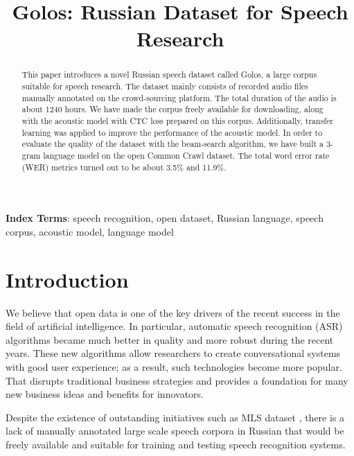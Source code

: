 \documentclass[a4paper]{article}
\title{Golos: Russian Dataset for Speech Research}
\begin{document}
\maketitle
% 
\begin{abstract}
 
This paper introduces a novel Russian speech dataset called Golos, a large corpus suitable for speech research. The dataset mainly consists of recorded audio files manually annotated on the crowd-sourcing platform. The total duration of the audio is about 1240 hours. We have made the corpus freely available for downloading, along with the acoustic model with CTC loss prepared on this corpus. Additionally, transfer learning was applied to improve the performance of the acoustic model. In order to evaluate the quality of the dataset with the beam-search algorithm, we have built a 3-gram language model on the open Common Crawl dataset. The total word error rate (WER) metrics turned out to be about 3.5\% and 11.9\%.

\end{abstract}
\noindent\textbf{Index Terms}: speech recognition, open dataset, Russian language, speech corpus, acoustic model, language model

\section{Introduction}
We believe that open data is one of the key drivers of the recent success in the field of artificial intelligence. In particular, automatic speech recognition (ASR) algorithms became much better in quality and more robust during the recent years. These new algorithms allow researchers to create conversational systems with good user experience; as a result, such technologies become more popular. That disrupts traditional business strategies and provides a foundation for many new business ideas and benefits for innovators. 
  
Despite the existence of outstanding initiatives such as MLS dataset \cite{pratap2020mls}, there is a lack of manually annotated large scale speech corpora in Russian that would be freely available and suitable for training and testing speech recognition systems.
 
\end{document}
